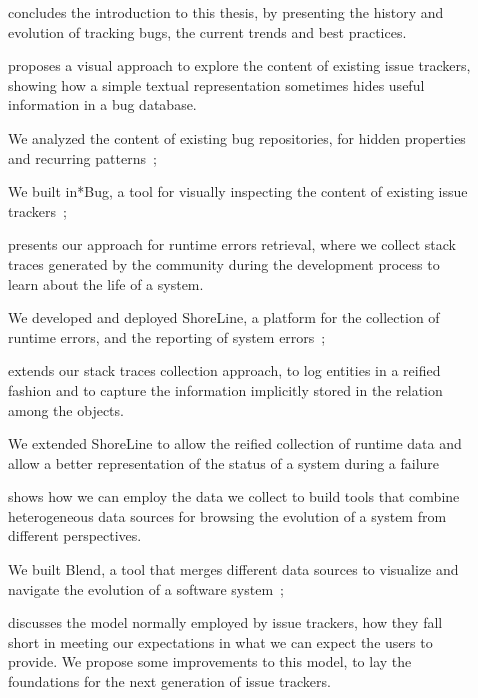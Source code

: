 \begin{description}
  \item[] concludes the introduction to this thesis, by presenting the history and evolution of tracking bugs, the current trends and best practices.

  \item[] proposes a visual approach to explore the content of existing issue trackers, showing how a simple textual representation sometimes hides useful information in a bug database.

  We analyzed the content of existing bug repositories, for hidden properties and recurring patterns~\cite{DalS2013a,DalS2016a};

  We built in*Bug, a tool for visually inspecting the content of existing issue trackers~\cite{DalS2013a,DalS2014a};


  \item[] presents our approach for runtime errors retrieval, where we collect stack traces generated by the community during the development process to learn about the life of a system.

  We developed and deployed ShoreLine, a platform for the collection of runtime errors, and the reporting of system errors~\cite{DalS2015a};


  \item[] extends our stack traces collection approach, to log entities in a reified fashion and to capture the information implicitly stored in the relation among the objects.

  We extended ShoreLine to allow the reified collection of runtime data and allow a better representation of the status of a system during a failure~\cite{DalS2017b}


  \item[] shows how we can employ the data we collect to build tools that combine heterogeneous data sources for browsing the evolution of a system from different perspectives.

  We built Blend, a tool that merges different data sources to visualize and navigate the evolution of a software system~\cite{DalS2015b};

  \item[] discusses the model normally employed by issue trackers, how they fall short in meeting our expectations in what we can expect the users to provide. We propose some improvements to this model, to lay the foundations for the next generation of issue trackers.


\end{description}
